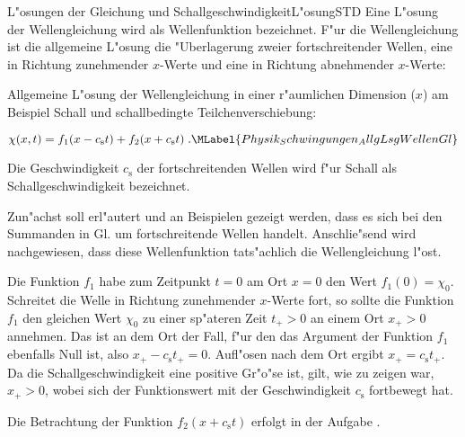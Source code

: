 \begin{MXContent}{L"osungen der Gleichung und Schallgeschwindigkeit}{L"osung}{STD}%
Eine L"osung der Wellengleichung wird als Wellenfunktion bezeichnet. F"ur die Wellengleichung  ist die allgemeine L"osung die "Uberlagerung zweier fortschreitender Wellen, eine in Richtung zunehmender $x$-Werte und eine in Richtung abnehmender $x$-Werte:

\begin{MInfo}
Allgemeine L"osung der Wellengleichung  in einer r"aumlichen Dimension ($x$) am Beispiel Schall und schallbedingte Teilchenverschiebung:

\begin{equation}
  \chi(x,t) = f_1(x-c_\mathrm{s}t)+f_2(x+c_\mathrm{s}t)\; . \MLabel{Physik_Schwingungen_AllgLsgWellenGl}
\end{equation}

Die Geschwindigkeit $c_\mathrm{s}$ der fortschreitenden Wellen wird f"ur Schall als Schallgeschwindigkeit bezeichnet.
\end{MInfo}

Zun"achst soll erl"autert und an Beispielen gezeigt werden, dass es sich bei den Summanden in Gl.  um fortschreitende Wellen handelt. Anschlie"send wird nachgewiesen, dass diese Wellenfunktion tats"achlich die Wellengleichung l"ost.

Die Funktion $f_1$ habe zum Zeitpunkt $t=0$ am Ort $x=0$ den Wert $f_1(0)=\chi_0$. Schreitet die Welle in Richtung zunehmender $x$-Werte fort, so sollte die Funktion $f_1$ den gleichen Wert $\chi_0$ zu einer sp"ateren Zeit $t_+>0$ an einem Ort $x_+>0$ annehmen. Das ist an dem Ort der Fall, f"ur den das Argument der Funktion $f_1$ ebenfalls Null ist, also $x_+-c_\mathrm{s}t_+=0$. Auf\/l"osen nach dem Ort ergibt $x_+=c_\mathrm{s}t_+$. Da die Schallgeschwindigkeit eine positive Gr"o"se ist, gilt, wie zu zeigen war, $x_+>0$, wobei sich der Funktionswert mit der Geschwindigkeit $c_\mathrm{s}$ fortbewegt hat.

Die Betrachtung der Funktion $f_2(x+c_\mathrm{s}t)$ erfolgt in der Aufgabe 
.


\end{MXContent}
